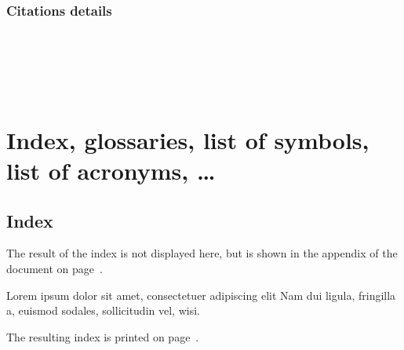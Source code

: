 \begin{filecontents*}{\democodefile}
\cite{companion,augustine,bertram,cotton,hammond,massa,murray}
\end{filecontents*}

%

\subsubsection{Citations details}

\begin{filecontents*}{\democodefile}
\cite{companion} \\
 \\
\citeyear{companion} \\
\citeauthor{companion} \\
\end{filecontents*}

%



\clearpage
\section{Index, glossaries, list of symbols, list of acronyms, \ldots}

\subsection{Index}

The result of the index is not displayed here, but is shown in the appendix of the document on page~\pageref{sec:Index}.


\begin{filecontents*}{\democodefile}
Lorem ipsum 
dolor sit amet, consectetuer adipiscing 
elit Nam dui ligula, fringilla a, euismod sodales, 
sollicitudin vel, wisi.

The resulting index is printed on page~\pageref{sec:Index}.
\end{filecontents*}

%


